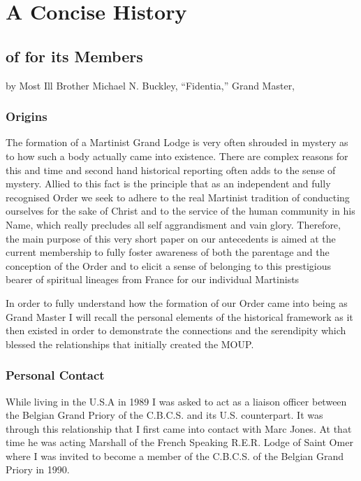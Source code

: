 \chapter{A Concise History}

\section{of \mouplong{} for its Members}

by Most Ill\hexdot{} Brother Michael N. Buckley, ``Fidentia,'' Grand Master, \sigi{}

\subsection{Origins}

The formation of a Martinist Grand Lodge is very often shrouded in mystery as to how such a
body actually came into existence. There are complex reasons for this and time and second hand
historical reporting often adds to the sense of mystery. Allied to this fact is the principle that as an
independent and fully recognised Order we seek to adhere to the real Martinist tradition of
conducting ourselves for the sake of Christ and to the service of the human community in his
Name, which really precludes all self aggrandisment and vain glory. Therefore, the main purpose
of this very short paper on our antecedents is aimed at the current membership to fully foster
awareness of both the parentage and the conception of the Order and to elicit a sense of belonging
to this prestigious bearer of spiritual lineages from France for our individual Martinists

In order to fully understand how the formation of our Order came into being as Grand Master I
will recall the personal elements of the historical framework as it then existed in order to
demonstrate the connections and the serendipity which blessed the relationships that initially
created the MOUP.

\subsection{Personal Contact}

While living in the U.S.A in 1989 I was asked to act as a liaison officer between the Belgian
Grand Priory of the C.B.C.S. and its U.S. counterpart. It was through this relationship that I first
came into contact with Marc Jones. At that time he was acting Marshall of the French Speaking
R.E.R. Lodge of Saint Omer where I was invited to become a member of the C.B.C.S. of the
Belgian Grand Priory in 1990.


